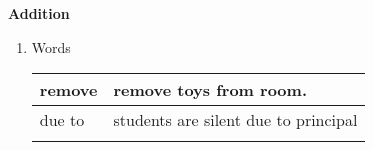 \centerline{\textbf{ \LARGE  Addition }}

\begin{enumerate}



    \item Words

    \begin{myTableStyle} \begin{tabular}{ |m{3cm}|m{10cm}| } \hline
        remove &  remove toys from room. \\\hline
        due to &  students are silent due to principal\\\hline
        &  \\\hline
    \end{tabular} \end{myTableStyle} \vspace{0.08in}



\end{enumerate}
